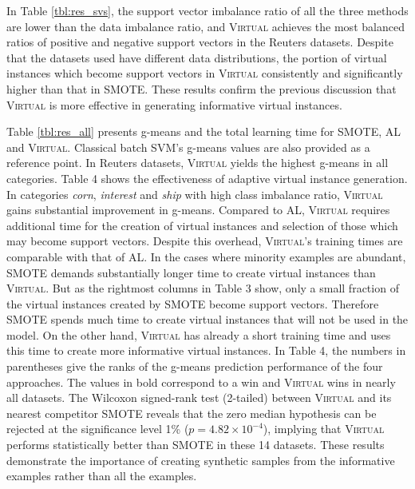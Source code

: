 In Table \ref{tbl:res_svs}, the support vector imbalance ratio of all the three methods are lower than the data imbalance ratio, and \textsc{Virtual} achieves the most balanced ratios of positive and negative support vectors in the Reuters datasets. Despite that the datasets used have different data distributions, the portion of virtual instances which become support vectors in \textsc{Virtual} consistently and significantly higher than that in SMOTE. These results confirm the previous discussion that \textsc{Virtual} is more effective in generating informative virtual instances.

Table \ref{tbl:res_all} presents g-means and the total learning time for SMOTE, AL and  \textsc{Virtual}. Classical batch SVM's g-means values are also provided as a reference point. In Reuters datasets, \textsc{Virtual} yields the highest g-means in all categories. Table 4 shows the effectiveness of adaptive virtual instance generation. In categories \emph{corn}, \emph{interest} and \emph{ship} with high class imbalance ratio, \textsc{Virtual} gains substantial improvement in g-means. Compared to AL, \textsc{Virtual} requires additional time for the creation of virtual instances and selection of those which may become support vectors. Despite this overhead, \textsc{Virtual}'s training times are comparable with that of AL. In the cases where minority examples are abundant, SMOTE demands substantially longer time to create virtual instances than \textsc{Virtual}. But as the rightmost columns in Table 3 show, only a small fraction of the virtual instances created by SMOTE become support vectors. Therefore SMOTE spends much time to create virtual instances that will not be used in the model. On the other hand, \textsc{Virtual} has already a short training time and uses this time to create more informative virtual instances. In Table 4, the numbers in parentheses give the ranks of the g-means prediction performance of the four approaches. The values in bold correspond to a win and \textsc{Virtual} wins in nearly all datasets.  The Wilcoxon signed-rank test (2-tailed) between \textsc{Virtual} and its nearest competitor SMOTE reveals that the zero median hypothesis can be rejected at the significance level 1\% ($p=4.82 \times 10^{-4}$), implying that \textsc{Virtual} performs statistically better than SMOTE in these 14 datasets. These results demonstrate the importance of creating synthetic samples from the informative examples rather than all the examples.


